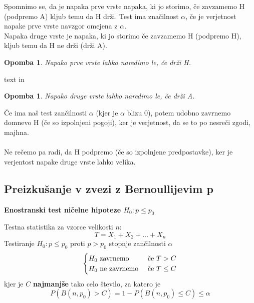\documentclass[11pt]{article}
\newtheorem{Opomba}[Izrek]{{\sc Opomba}}
\begin{document}
	Spomnimo se, da je napaka prve vrste napaka, ki jo storimo, če zavzamemo H (podpremo A) kljub temu da H drži. Test ima značilnost $\alpha$, če je verjetnost napake prve vrste navzgor omejena z $\alpha$.
	\\
	Napaka druge vrste je napaka, ki jo storimo če zavzamemo H (podpremo H), kljub temu da H ne drži (drži A).
	\begin{Opomba}
		Napako prve vrste lahko naredimo le, če drži H.
	\end{Opomba}text in 
	\begin{Opomba}
		Napako druge vrste lahko naredimo le, če drži A.
	\end{Opomba}
	Če ima naš test zančilnosti $\alpha$ (kjer je $\alpha$ blizu 0), potem udobno zavrnemo domnevo H (če so izpolnjeni pogoji), ker je verjetnost, da se to po nesreči zgodi, majhna.
	\\
	\\
	Ne rečemo pa radi, da H podpremo (če so izpolnjene predpostavke), ker je verjentost napake druge vrste lahko velika.
	\subsection{Preizkušanje v zvezi z Bernoullijevim p}
	\begin{framed}
		\begin{center}
			\textbf{Enostranski test ničelne hipoteze $H_0: p\le p_0$}
		\end{center}
		Testna statistika za vzorce velikosti $n$:
		$$T = X_1 + X_2 +\ldots + X_n$$
		Testiranje $H_0: p\le p_0$ proti $p > p_0$ stopnje zančilnosti $\alpha$
			\[
		\begin{cases}
		H_0 \textnormal{ zavrnemo } & \textnormal{če } T> C\\
		H_0 \textnormal{ ne zavrnemo } & \textnormal{če }  T\le C
		\end{cases}
		\]
		kjer je $C$ \textbf{najmanjše} tako celo število, za katero je 
		$$P(B(n,p_0) > C) = 1 - P(B(n,p_0) \le C) \le \alpha$$
	\end{framed}
	
\end{document}
